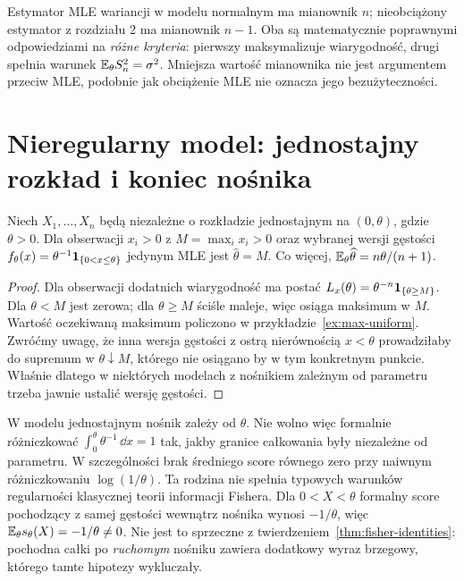 \begin{uwaga}
Estymator MLE wariancji w modelu normalnym ma mianownik $n$;
nieobciążony estymator z rozdziału 2 ma mianownik $n-1$.
Oba są matematycznie poprawnymi odpowiedziami na \emph{różne kryteria}:
pierwszy maksymalizuje wiarygodność, drugi spełnia warunek
$\mathbb E_\theta S_n^2=\sigma^2$. Mniejsza wartość mianownika nie jest
argumentem przeciw MLE, podobnie jak obciążenie MLE nie oznacza jego
bezużyteczności.
\end{uwaga}

\section{Nieregularny model: jednostajny rozkład i koniec nośnika}
\begin{twierdzenie}\label{thm:mle-uniform}
Niech $X_1,\ldots,X_n$ będą niezależne o rozkładzie jednostajnym na
$(0,\theta)$, gdzie $\theta>0$. Dla obserwacji $x_i>0$ z
$M=\max_i x_i>0$ oraz wybranej wersji gęstości
$f_\theta(x)=\theta^{-1}\mathbf 1_{\{0<x\le\theta\}}$ jedynym MLE jest
$\widehat\theta=M$. Co więcej, $\mathbb E_\theta\widehat\theta=n\theta/(n+1)$.
\end{twierdzenie}
\begin{proof}
Dla obserwacji dodatnich wiarygodność ma postać
$L_x(\theta)=\theta^{-n}\mathbf 1_{\{\theta\ge M\}}$.
Dla $\theta<M$ jest zerowa; dla $\theta\ge M$ ściśle maleje, więc
osiąga maksimum w $M$. Wartość oczekiwaną maksimum policzono
w przykładzie~\ref{ex:max-uniform}. Zwróćmy uwagę, że inna wersja
gęstości z ostrą nierównością $x<\theta$ prowadziłaby do supremum
w $\theta\downarrow M$, którego nie osiągano by w tym konkretnym punkcie.
Właśnie dlatego w niektórych modelach z nośnikiem zależnym od parametru
trzeba jawnie ustalić wersję gęstości.
\end{proof}

\begin{uwaga}
W modelu jednostajnym nośnik zależy od $\theta$. Nie wolno więc
formalnie różniczkować $\int_0^\theta\theta^{-1}\,\dd x=1$
tak, jakby granice całkowania były niezależne od parametru.
W szczególności brak średniego score równego zero przy naiwnym
różniczkowaniu $\log(1/\theta)$. Ta rodzina nie spełnia typowych
warunków regularności klasycznej teorii informacji Fishera.
Dla $0<X<\theta$ formalny score pochodzący z samej gęstości
wewnątrz nośnika wynosi $-1/\theta$, więc
$\mathbb E_\theta s_\theta(X)=-1/\theta\ne0$.
Nie jest to sprzeczne z twierdzeniem~\ref{thm:fisher-identities}:
pochodna całki po \emph{ruchomym} nośniku zawiera dodatkowy wyraz
brzegowy, którego tamte hipotezy wykluczały.
\end{uwaga}

